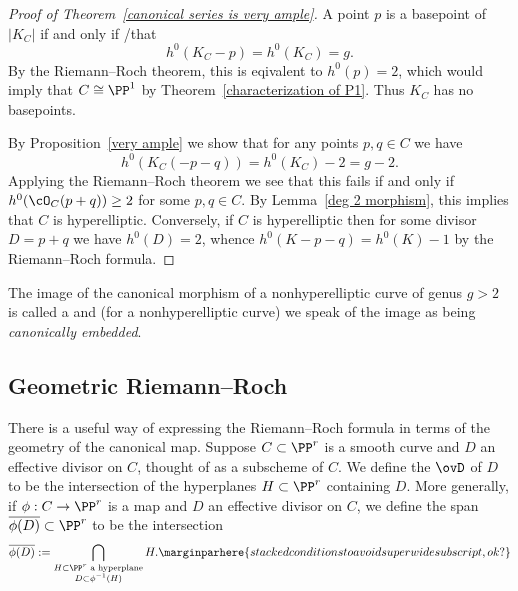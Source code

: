 \begin{proof}[Proof of Theorem~\ref{canonical series is very ample}]
A point $p$ is a basepoint of $|K_C|$ if and only if 
/that
$$h^0(K_C-p) = h^0(K_C) = g.$$ 
By the Riemann--Roch theorem,
this is eqivalent to $h^0(p) =2$, which would imply that $C\cong \PP^1$ by Theorem~\ref{characterization of P1}. Thus $K_C$
has no basepoints.

By Proposition~\ref{very ample} we 
show that for any 
points $p, q \in C$ we have
\unskip{}
$$
h^0(K_C(-p-q)) = h^0(K_C)-2 = g-2.
$$
Applying the Riemann--Roch theorem we see 
that this fails if and only if $h^0(\cO_C(p+q)) \geq 2$ for some $p,q
\in C$. By Lemma~\ref{deg 2 morphism}, this implies that $C$ is
hyperelliptic. Conversely, if $C$ is hyperelliptic then for some
divisor $D = p+q$ we have $h^0(D) = 2$, whence $h^0(K-p-q) = h^0(K)
-1$ by 
the Riemann--Roch formula.
\end{proof}

The image of the canonical morphism of a nonhyperelliptic curve of
genus $g>2$ is called a 
%
and (for a nonhyperelliptic curve) we  
speak of the image as being \emph{canonically embedded}.


\subsection*{Geometric Riemann--Roch}

There is a useful way of expressing the Riemann--Roch formula in terms
of the geometry of the canonical map. Suppose $C \subset \PP^r$ is a
smooth curve and $D$ an effective divisor on $C$, thought of as a
subscheme of $C$. We define the 
%
$\ovD$ of $D$ to be the
intersection of the hyperplanes $H \subset \PP^r$ containing $D$. More
generally, if $\phi : C \to \PP^r$ is a map and $D$ an effective
divisor on $C$, we define the span $\overline{\phi(D)} \subset \PP^r$
to be the intersection 
$$
\overline{\phi(D)} := \bigcap_{ 
\substack{H \subset \PP^r \text{ a hyperplane} \\D \subset
  \phi^{-1}(H)}}
H.
\marginparhere{stacked conditions to avoid superwide subscript, ok?}
$$


